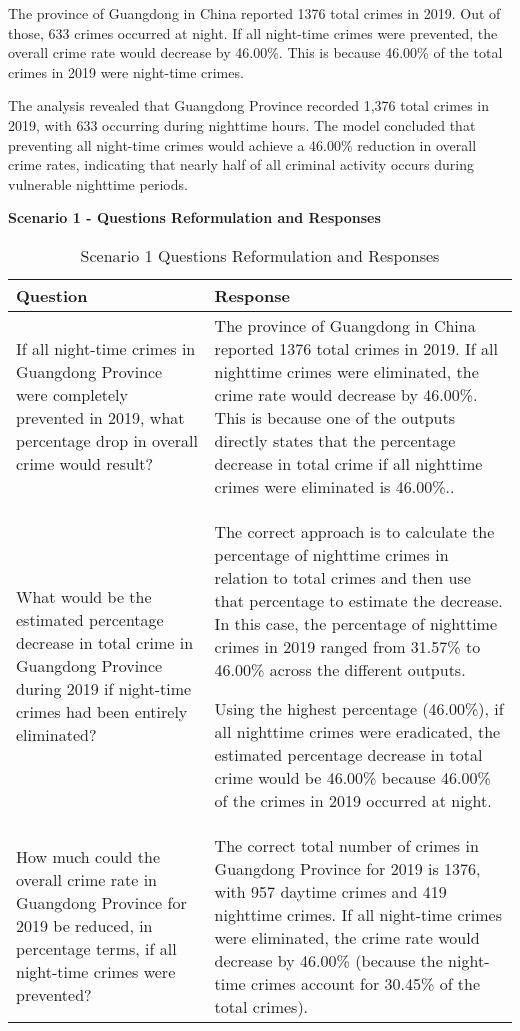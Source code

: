 \begin{tcolorbox}[colback=white!95!black, colframe=black, title=Q1 Response, fontupper=\scriptsize, boxsep=2pt, left=3pt, right=3pt]
  The province of Guangdong in China reported 1376 total crimes in 2019. Out of those, 633 crimes occurred at night. If all night-time crimes were prevented, the overall crime rate would decrease by 46.00\%. This is because 46.00\% of the total crimes in 2019 were night-time crimes.
\end{tcolorbox}

The analysis revealed that Guangdong Province recorded 1,376 total crimes in 2019, with 633 occurring during nighttime hours. The model concluded that preventing all night-time crimes would achieve a 46.00\% reduction in overall crime rates, indicating that nearly half of all criminal activity occurs during vulnerable nighttime periods.


\noindent \textbf{Scenario 1 - Questions Reformulation and Responses}

\begin{table}[hbtp]
\centering
\small
\begin{tabular}{|p{}|p{}|}
\hline
\textbf{Question} & \textbf{Response} \\
\hline
If all night-time crimes in Guangdong Province were completely prevented in 2019, what percentage drop in overall crime would result? & The province of Guangdong in China reported 1376 total crimes in 2019. If all nighttime crimes were eliminated, the crime rate would decrease by 46.00\%. This is because one of the outputs directly states that the percentage decrease in total crime if all nighttime crimes were eliminated is 46.00\%.. \\
\hline
What would be the estimated percentage decrease in total crime in Guangdong Province during 2019 if night-time crimes had been entirely eliminated? & The correct approach is to calculate the percentage of nighttime crimes in relation to total crimes and then use that percentage to estimate the decrease. In this case, the percentage of nighttime crimes in 2019 ranged from 31.57\% to 46.00\% across the different outputs.

Using the highest percentage (46.00\%), if all nighttime crimes were eradicated, the estimated percentage decrease in total crime would be 46.00\% because 46.00\% of the crimes in 2019 occurred at night. \\
\hline
How much could the overall crime rate in Guangdong Province for 2019 be reduced, in percentage terms, if all night-time crimes were prevented? & The correct total number of crimes in Guangdong Province for 2019 is 1376, with 957 daytime crimes and 419 nighttime crimes. If all night-time crimes were eliminated, the crime rate would decrease by 46.00\% (because the night-time crimes account for 30.45\% of the total crimes). \\
\hline
\end{tabular}
\caption{Scenario 1 Questions Reformulation and Responses}
\label{tab:questions_responses}
\end{table}

